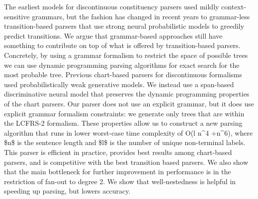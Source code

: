 The earliest models for discontinuous constituency parsers used mildly context-sensitive grammars, but the fashion has changed in recent years to grammar-less transition-based parsers that use strong neural probabilistic models to greedily predict transitions. We argue that grammar-based approaches still have something to contribute on top of what is offered by transition-based parsers. Concretely, by using a grammar formalism to restrict the space of possible trees we can use dynamic programming parsing algorithms for exact search for the most probable tree. Previous chart-based parsers for discontinuous formalisms used probabilistically weak generative models. We instead use a span-based discriminative neural model that preserves the dynamic programming properties of the chart parsers. Our parser does not use an explicit grammar, but it does use explicit grammar formalism constraints: we generate only trees that are within the LCFRS-2 formalism. These properties allow us to construct a new parsing algorithm that runs in lower worst-case time complexity of O(l n^4 +n^6), where \$n\$ is the sentence length and \$l\$ is the number of unique non-terminal labels. This parser is efficient in practice, provides best results among chart-based parsers, and is competitive with the best transition based parsers. We also show that the main bottleneck for further improvement in performance is in the restriction of fan-out to degree 2. We show that well-nestedness is helpful in speeding up parsing, but lowers accuracy.
